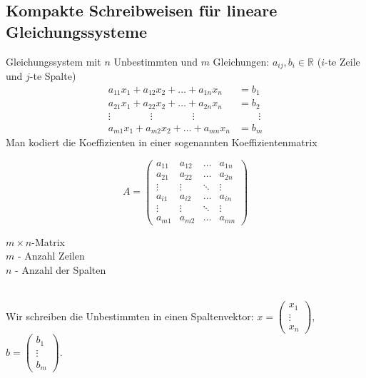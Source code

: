 \documentclass[12pt,a4paper]{article}
\theoremstyle{plain}
\newcommand{\R}{\mathbb{R}}
\numberwithin{equation}{section}
\begin{document}
\subsection{Kompakte Schreibweisen für lineare Gleichungssysteme}
Gleichungssystem mit $n$ Unbestimmten und $m$ Gleichungen: $a_{ij},b_i\in\R$ ($i$-te Zeile und $j$-te Spalte) \begin{align}
a_{11}x_1+a_{12}x_2+\ldots+a_{1n}x_n&=b_1 \nonumber \\ 
a_{21}x_1+a_{22}x_2+\ldots+a_{2n}x_n&=b_2  \nonumber\\ 
\vdots\qquad\qquad \vdots \qquad\qquad \vdots \qquad&\qquad \vdots \nonumber\\ 
a_{m1}x_1+a_{m2}x_2+\ldots+a_{mn}x_n&=b_m \nonumber
\end{align}
Man kodiert die Koeffizienten in einer sogenannten Koeffizientenmatrix\\
\begin{minipage}{8cm}\[
A=\left(\begin{matrix}
a_{11} & a_{12} & \ldots & a_{1n} \\
a_{21} & a_{22} & \ldots & a_{2n} \\
\vdots & \vdots & \ddots & \vdots \\
a_{i1} & a_{i2} & \ldots & a_{in} \\
\vdots & \vdots & \ddots & \vdots \\
a_{m1} & a_{m2} & \ldots & a_{mn} 
\end{matrix} \right)
\]
\end{minipage} \begin{minipage}{5cm}$m\times n$-Matrix \\
$m$ - Anzahl Zeilen \\
$n$ - Anzahl der Spalten
\end{minipage}\\
Wir schreiben die Unbestimmten in einen Spaltenvektor: $x=\left(\begin{array}{c}x_1\\  \vdots\\x_n\end{array}\right)$, $b=\left(\begin{array}{c} b_1 \\ \vdots \\b_m\end{array} \right)$.
\end{document}
